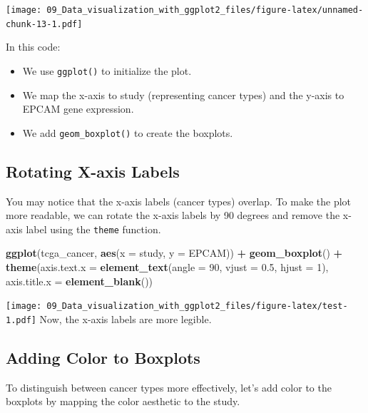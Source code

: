 \documentclass[
]{book}
\newenvironment{Shaded}{\begin{snugshade}}{\end{snugshade}}
\newcommand{\AttributeTok}[1]{\textcolor[rgb]{0.13,0.29,0.53}{#1}}
\newcommand{\DecValTok}[1]{\textcolor[rgb]{0.00,0.00,0.81}{#1}}
\newcommand{\FloatTok}[1]{\textcolor[rgb]{0.00,0.00,0.81}{#1}}
\newcommand{\FunctionTok}[1]{\textcolor[rgb]{0.13,0.29,0.53}{\textbf{#1}}}
\newcommand{\NormalTok}[1]{#1}
\newcommand{\SpecialCharTok}[1]{\textcolor[rgb]{0.81,0.36,0.00}{\textbf{#1}}}
\begin{document}
\texttt{[image: 09\_Data\_visualization\_with\_ggplot2\_files/figure-latex/unnamed-chunk-13-1.pdf]}

In this code:

\begin{itemize}
\item
  We use \texttt{ggplot()} to initialize the plot.
\item
  We map the x-axis to study (representing cancer types) and the y-axis to EPCAM gene expression.
\item
  We add \texttt{geom\_boxplot()} to create the boxplots.
\end{itemize}

\hypertarget{rotating-x-axis-labels}{%
\subsection{Rotating X-axis Labels}\label{rotating-x-axis-labels}}

You may notice that the x-axis labels (cancer types) overlap. To make the plot more readable, we can rotate the x-axis labels by 90 degrees and remove the x-axis label using the \texttt{theme} function.

\begin{Shaded}
\begin{Highlighting}[]
\FunctionTok{ggplot}\NormalTok{(tcga\_cancer, }\FunctionTok{aes}\NormalTok{(}\AttributeTok{x =}\NormalTok{ study, }\AttributeTok{y =}\NormalTok{ EPCAM)) }\SpecialCharTok{+}
  \FunctionTok{geom\_boxplot}\NormalTok{() }\SpecialCharTok{+}
  \FunctionTok{theme}\NormalTok{(}\AttributeTok{axis.text.x =} \FunctionTok{element\_text}\NormalTok{(}\AttributeTok{angle =} \DecValTok{90}\NormalTok{, }\AttributeTok{vjust =} \FloatTok{0.5}\NormalTok{, }\AttributeTok{hjust =} \DecValTok{1}\NormalTok{),}
        \AttributeTok{axis.title.x =} \FunctionTok{element\_blank}\NormalTok{())}
\end{Highlighting}
\end{Shaded}

\texttt{[image: 09\_Data\_visualization\_with\_ggplot2\_files/figure-latex/test-1.pdf]}
Now, the x-axis labels are more legible.

\hypertarget{adding-color-to-boxplots}{%
\subsection{Adding Color to Boxplots}\label{adding-color-to-boxplots}}

To distinguish between cancer types more effectively, let's add color to the boxplots by mapping the color aesthetic to the study.
\end{document}
